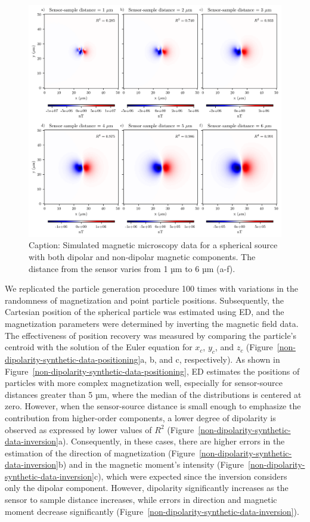 \begin{figure}[tb!]
  \centering
  \includegraphics[width=1\linewidth]{paper/figures/non-dipolarity-synthetic.png}
  \caption{Caption: Simulated magnetic microscopy data for a spherical source with both dipolar and non-dipolar magnetic components. The distance from the sensor varies from 1 µm to 6 µm (a-f).}
  \label{non-dipolarity-synthetic-data}
\end{figure}

We replicated the particle generation procedure 100 times with variations in the randomness of magnetization and point particle positions. Subsequently, the Cartesian position of the spherical particle was estimated using ED, and the magnetization parameters were determined by inverting the magnetic field data. The effectiveness of position recovery was measured by comparing the particle's centroid with the solution of the Euler equation for $x_c$, $y_c$, and $z_c$ (Figure~\ref{non-dipolarity-synthetic-data-positioning}a, b, and c, respectively). As shown in Figure~\ref{non-dipolarity-synthetic-data-positioning}, ED estimates the positions of particles with more complex magnetization well, especially for sensor-source distances greater than 5 µm, where the median of the distributions is centered at zero. However, when the sensor-source distance is small enough to emphasize the contribution from higher-order components, a lower degree of dipolarity is observed as expressed by lower values of $R^2$ (Figure~\ref{non-dipolarity-synthetic-data-inversion}a). Consequently, in these cases, there are higher errors in the estimation of the direction of magnetization (Figure~\ref{non-dipolarity-synthetic-data-inversion}b) and in the magnetic moment's intensity (Figure~\ref{non-dipolarity-synthetic-data-inversion}c), which were expected since the inversion considers only the dipolar component. However, dipolarity significantly increases as the sensor to sample distance increases, while errors in direction and magnetic moment decrease significantly (Figure~\ref{non-dipolarity-synthetic-data-inversion}).

